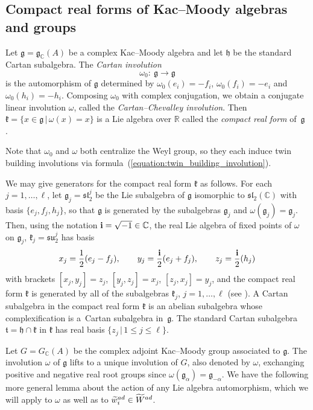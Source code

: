 \documentclass[11pt]{article}
\numberwithin{equation}{section}
\numberwithin{equation}{section}
\def\C{{\mathbb C}}
\def\R{\mathbb{R}}
\def\a{\alpha}
\def\wtil{\widetilde w}
\def\Wtil{\widetilde W}
\def\bi{{\bf i}}
\def\g{\mathfrak{g}}
\def\fg{\mathfrak{g}}
\def\h{\mathfrak{h}}
\def\k{\mathfrak{k}}
\def\ft{\mathfrak{t}}
\def\fsl{\mathfrak{sl}}
\def\fsu{\mathfrak{su}}
\begin{document}
\subsection{Compact real forms of Kac--Moody algebras and groups}\label{section:Campact_real_forms_of_KM_algebras_and_groups}

Let $\g=\g_{\C}(A)$ be a complex Kac--Moody algebra and let $\h$ be the standard Cartan subalgebra. The {\it Cartan involution}
\[{\omega}_0\colon \ \g\longrightarrow \g\]
is the automorphism of $\g$ determined by ${\omega}_0(e_i)=-f_i$, $\omega_0(f_i)=-e_i$ and ${\omega}_0(h_i)= -h_i$. Composing ${\omega}_0$ with complex conjugation, we obtain a conjugate linear involution $\omega$, called the {\it Cartan--Chevalley involution}. Then $\k=\{x\in\g\,|\, \omega(x)=x\}$ is a Lie algebra over $\R$ called the {\it compact real form} of~$\g$ \cite[p.~243]{Kumar02}.

Note that $\omega_0$ and $\omega$ both centralize the Weyl group, so they each induce twin building involutions via formula~(\ref{equation:twin_building_involution}).

We may give generators for the compact real form $\k$ as follows.
For each $j=1,\dots ,\ell$, let $\g_j = \fsl_2^j$ be the Lie subalgebra of $\g$ isomorphic to $\fsl_2(\C)$ with basis $\{e_j, f_j, h_j\}$, so that
$\g$ is generated by the subalgebras $\g_j$ and $\omega(\g_j)= \g_j$. Then, using the notation $\bi = \sqrt{-1}\in\C$,
the real Lie algebra of fixed points of $\omega$ on $\g_j$, $\k_j=\fsu_2^j$ has basis
\[x_j = \frac{1}{2}(e_j - f_j),\qquad y_j = \frac{\bi}{2}(e_j + f_j), \qquad z_j = \frac{\bi}{2}(h_j)\]
with brackets $[x_j,y_j] = z_j$, $[y_j,z_j] = x_j$, $[z_j,x_j] = y_j$, and the compact real form $\k$ is generated by all of the subalgebras
$\k_j$, $j=1,\dots ,\ell$ (see \cite[Proposition~1]{Berman85}). A Cartan subalgebra in the compact real form $\k$ is an abelian subalgebra whose complexification is a~Cartan subalgebra in~$\g$. The standard Cartan subalgebra $\ft =\h\cap \k$ in $\k$ has real basis $\{z_j\, |\, 1\leq j\leq \ell\}$.

Let $G=G_\C(A)$ be the complex adjoint Kac--Moody group associated to $\g$. The involution $\omega$ of $\g$ lifts to a unique involution of $G$, also denoted by $\omega$, exchanging positive and negative real root groups since $\omega(\fg_\a) = \fg_{-\a}$. We have the following more general lemma about the action of any Lie algebra automorphism, which we will apply to $\omega$ as well as to $\wtil^{\rm ad}_i\in\Wtil^{\rm ad}$.
\end{document}

